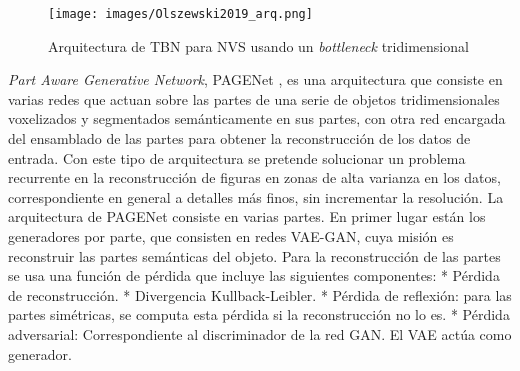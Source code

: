\documentclass[spanish]{article}
\begin{document}
\begin{figure}[h]
\texttt{[image: images/Olszewski2019\_arq.png]}
\centering
\caption{Arquitectura de TBN \cite{Wu2016} para NVS usando un \textit{bottleneck} tridimensional}
\label{TBN_arq}
\end{figure}


\textit{Part Aware Generative Network}, PAGENet \cite{Li2019}, es una
arquitectura que consiste en varias redes que actuan sobre las partes
de una serie de objetos tridimensionales voxelizados y segmentados
semánticamente en sus partes, con otra red encargada del ensamblado
de las partes para obtener la reconstrucción de los datos de entrada.
Con este tipo de arquitectura se pretende solucionar un problema
recurrente en la reconstrucción de figuras en zonas de alta varianza
en los datos, correspondiente en general a detalles más finos, sin
incrementar la resolución.
La arquitectura de PAGENet consiste en varias partes. En primer lugar
están los generadores por parte, que consisten en redes VAE-GAN, cuya
misión es reconstruir las partes semánticas del objeto.
Para la reconstrucción de las partes se usa una función de pérdida que
incluye las siguientes componentes:
* Pérdida de reconstrucción.
* Divergencia Kullback-Leibler.
* Pérdida de reflexión: para las partes simétricas, se computa esta
pérdida si la reconstrucción no lo es.
* Pérdida adversarial: Correspondiente al discriminador de la red GAN.
El VAE actúa como generador.
\end{document}
